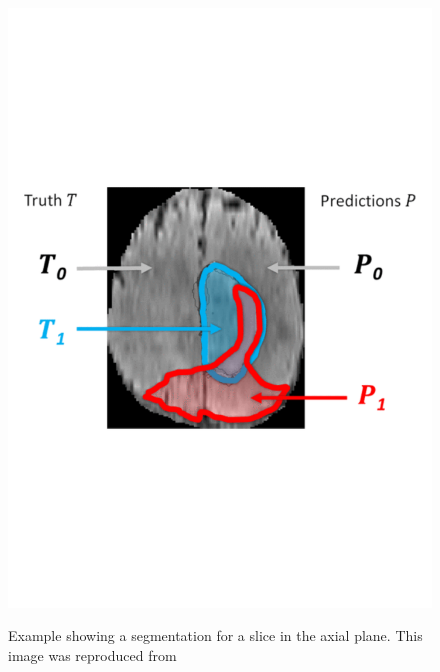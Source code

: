 \documentclass[12pt,a4paper,twoside,openright]{report}
\begin{document}
\begin{figure}[h]
	\centering
	\includegraphics[scale = 0.5]{example_evaluation}
	\label{fig:evaluation_example}
	\caption{Example showing a segmentation for a slice in the axial plane. This image was reproduced from \cite{brats-proceedings}}
\end{figure}
\end{document}
